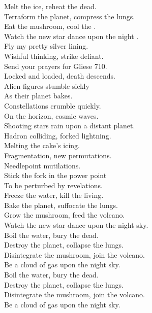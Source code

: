 

Melt the ice, reheat the dead. \\
Terraform the planet, compress the lungs. \\
Eat the mushroom, cool the . \\
Watch the new star dance upon the night . \\

Fly my pretty silver lining. \\
Wishful thinking, strike defiant. \\
Send your prayers for Gliese 710. \\
Locked and loaded, death descends. \\

Alien figures stumble sickly \\
As their planet bakes. \\
Constellations crumble quickly. \\
On the horizon, cosmic waves. \\

Shooting stars rain upon a distant planet. \\
Hadron colliding, forked lightning. \\
Melting the cake's icing. \\

Fragmentation, new permutations. \\
Needlepoint mutilations. \\
Stick the fork in the power point \\
To be perturbed by revelations. \\

Freeze the water, kill the living. \\
Bake the planet, suffocate the lungs. \\
Grow the mushroom, feed the volcano. \\
Watch the new star dance upon the night sky. \\

Boil the water, bury the dead. \\
Destroy the planet, collapse the lungs. \\
Disintegrate the mushroom, join the volcano. \\
Be a cloud of gas upon the night sky. \\

Boil the water, bury the dead. \\
Destroy the planet, collapse the lungs. \\
Disintegrate the mushroom, join the volcano. \\
Be a cloud of gas upon the night sky. \\
